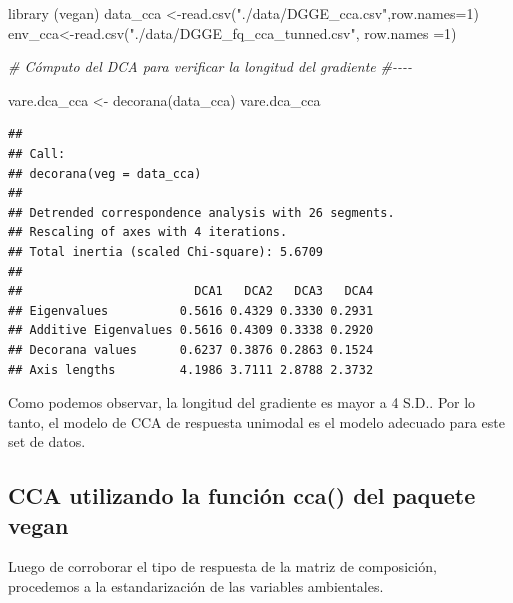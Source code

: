 \documentclass[
]{book}
\newenvironment{Shaded}{\begin{snugshade}}{\end{snugshade}}
\newcommand{\AttributeTok}[1]{\textcolor[rgb]{0.77,0.63,0.00}{#1}}
\newcommand{\CommentTok}[1]{\textcolor[rgb]{0.56,0.35,0.01}{\textit{#1}}}
\newcommand{\DecValTok}[1]{\textcolor[rgb]{0.00,0.00,0.81}{#1}}
\newcommand{\FunctionTok}[1]{\textcolor[rgb]{0.00,0.00,0.00}{#1}}
\newcommand{\NormalTok}[1]{#1}
\newcommand{\OtherTok}[1]{\textcolor[rgb]{0.56,0.35,0.01}{#1}}
\newcommand{\StringTok}[1]{\textcolor[rgb]{0.31,0.60,0.02}{#1}}
\begin{document}
\begin{Shaded}
\begin{Highlighting}[]
\FunctionTok{library}\NormalTok{ (vegan)}
\NormalTok{data\_cca }\OtherTok{\textless{}{-}}\FunctionTok{read.csv}\NormalTok{(}\StringTok{"./data/DGGE\_cca.csv"}\NormalTok{,}\AttributeTok{row.names=}\DecValTok{1}\NormalTok{)}
\NormalTok{env\_cca}\OtherTok{\textless{}{-}}\FunctionTok{read.csv}\NormalTok{(}\StringTok{"./data/DGGE\_fq\_cca\_tunned.csv"}\NormalTok{, }\AttributeTok{row.names =}\DecValTok{1}\NormalTok{)}
\end{Highlighting}
\end{Shaded}

\begin{Shaded}
\begin{Highlighting}[]
\CommentTok{\# Cómputo del DCA para verificar la longitud del gradiente}
\CommentTok{\#{-}{-}{-}{-}}

\NormalTok{vare.dca\_cca }\OtherTok{\textless{}{-}} \FunctionTok{decorana}\NormalTok{(data\_cca)}
\NormalTok{vare.dca\_cca}
\end{Highlighting}
\end{Shaded}

\begin{verbatim}
## 
## Call:
## decorana(veg = data_cca) 
## 
## Detrended correspondence analysis with 26 segments.
## Rescaling of axes with 4 iterations.
## Total inertia (scaled Chi-square): 5.6709 
## 
##                        DCA1   DCA2   DCA3   DCA4
## Eigenvalues          0.5616 0.4329 0.3330 0.2931
## Additive Eigenvalues 0.5616 0.4309 0.3338 0.2920
## Decorana values      0.6237 0.3876 0.2863 0.1524
## Axis lengths         4.1986 3.7111 2.8788 2.3732
\end{verbatim}

Como podemos observar, la longitud del gradiente es mayor a 4 S.D.. Por lo tanto, el modelo de CCA de respuesta unimodal es el modelo adecuado para este set de datos.

\hypertarget{cca-utilizando-la-funciuxf3n-cca-del-paquete-vegan}{%
\subsection{\texorpdfstring{CCA utilizando la función \textbf{cca()} del paquete \textbf{vegan}}{CCA utilizando la función cca() del paquete vegan}}\label{cca-utilizando-la-funciuxf3n-cca-del-paquete-vegan}}

Luego de corroborar el tipo de respuesta de la matriz de composición, procedemos a la estandarización de las variables ambientales.
\end{document}
